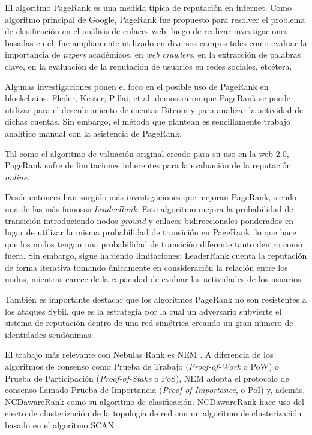 El algoritmo PageRank \cite{page1999pagerank} es una medida típica de reputación en internet. Como algoritmo principal de Google, PageRank fue propuesto para resolver el problema de clasificación en el análisis de enlaces web; luego de realizar investigaciones basadas en él, fue ampliamente utilizado en diversos campos tales como evaluar la importancia de \textit{papers} académicos, en \textit{web crawlers}, en la extracción de palabras clave, en la evaluación de la reputación de usuarios en redes sociales, etcétera.

Algunas investigaciones ponen el foco en el posible uso de PageRank en blockchains. Fleder, Kester, Pillai, et al. demostraron que PageRank se puede utilizar para el descubrimiento de cuentas Bitcoin y para analizar la actividad de dichas cuentas\cite{Fleder2015}. Sin embargo, el método que plantean es sencillamente trabajo analítico manual con la asistencia de PageRank.

Tal como el algoritmo de valuación original creado para su uso en la web 2.0, PageRank sufre de limitaciones inherentes para la evaluación de la reputación \textit{online}.

Desde entonces han surgido más investigaciones que mejoran PageRank, siendo una de las más famosas \textit{LeaderRank}. Este algoritmo mejora la probabilidad de transición introduciendo nodos \textit{ground} y enlaces bidireccionales ponderados en lugar de utilizar la misma probabilidad de transición en PageRank, lo que hace que los nodos tengan una probabilidad de transición diferente tanto dentro como fuera. Sin embargo, sigue habiendo limitaciones: LeaderRank cuenta la reputación de forma iterativa tomando únicamente en consideración la relación entre los nodos, mientras carece de la capacidad de evaluar las actividades de los usuarios.

También es importante destacar que los algoritmos PageRank no son resistentes a los ataques Sybil\cite{cheng2006manipulability}, que es la estrategia por la cual un adversario subvierte el sistema de reputación dentro de una red simétrica creando un gran número de identidades seudónimas.

El trabajo más relevante con Nebulas Rank es NEM \cite{nem}. A diferencia de los algoritmos de consenso como Prueba de Trabajo (\textit{Proof-of-Work} o PoW) o Prueba de Participación (\textit{Proof-of-Stake} o PoS), NEM adopta el protocolo de consenso llamado Prueba de Importancia (\textit{Proof-of-Importance}, o PoI) y, además, NCDawareRank \cite{Nikolakopoulos2013} como su algoritmo de clasificación. NCDawareRank hace uso del efecto de clusterización de la topología de red con un algoritmo de clusterización basado en el algoritmo SCAN \cite{xu2007scan} \cite{shiokawa2015scan} \cite{chang2017mathsf}.

